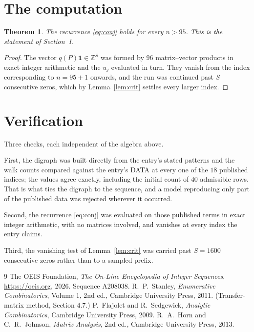 \documentclass[11pt,a4paper]{article}
\theoremstyle{plain}
\newtheorem{theorem}{Theorem}
\theoremstyle{definition}
\begin{document}
\section{The computation}

\begin{theorem}
The recurrence \eqref{eq:conj} holds for every $n>95$. This is the statement of
Section~1.
\end{theorem}

\begin{proof}
The vector $q(P)\mathbf{1}\in\mathbb{Z}^{S}$ was formed by $96$ matrix--vector
products in exact integer arithmetic and the $u_j$ evaluated in turn. They vanish from the
index corresponding to $n=95+1$ onwards, and the run was continued past $S$ consecutive
zeros, which by Lemma~\ref{lem:crit} settles every larger index.
\end{proof}

\section{Verification}

Three checks, each independent of the algebra above.

First, the digraph was built directly from the entry's stated patterns and the walk counts
compared against the entry's DATA at every one of the $18$ published indices; the
values agree exactly, including the initial count of $40$ admissible rows. That is
what ties the digraph to the sequence, and a model reproducing only part of the published
data was rejected wherever it occurred.

Second, the recurrence \eqref{eq:conj} was evaluated on those published terms in exact
integer arithmetic, with no matrices involved, and vanishes at every index the entry claims.

Third, the vanishing test of Lemma~\ref{lem:crit} was carried past $S=1600$ consecutive
zeros rather than to a sampled prefix.

\begin{thebibliography}{9}
 The OEIS Foundation, \emph{The On-Line Encyclopedia of Integer
Sequences}, \url{https://oeis.org}, 2026. Sequence A208038.
 R.~P.~Stanley, \emph{Enumerative Combinatorics}, Volume 1, 2nd ed.,
Cambridge University Press, 2011. (Transfer-matrix method, Section 4.7.)
 P.~Flajolet and R.~Sedgewick, \emph{Analytic Combinatorics}, Cambridge
University Press, 2009.
 R.~A.~Horn and C.~R.~Johnson, \emph{Matrix Analysis}, 2nd ed., Cambridge
University Press, 2013.
\end{thebibliography}
\end{document}
